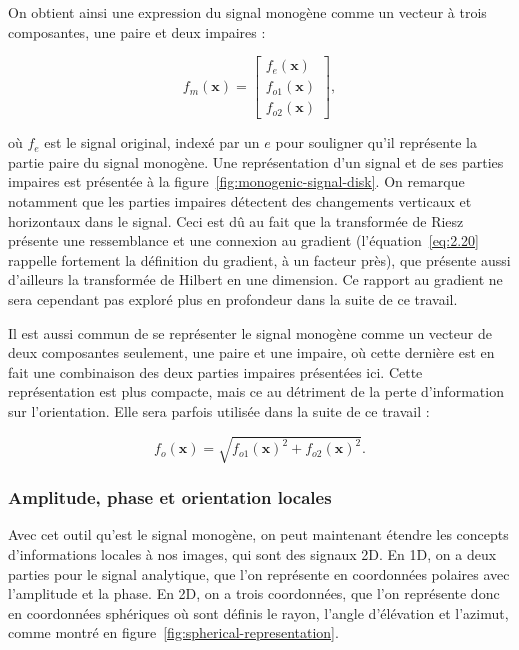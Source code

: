 On obtient ainsi une expression du signal monogène comme un vecteur à trois composantes, une paire et deux impaires :

\begin{equation}
    f_m(\mathbf{x}) =
    \left[
        \begin{array}{c}
        f_e(\mathbf{x}) \\
        f_{o1}(\mathbf{x}) \\
        f_{o2}(\mathbf{x})
        \end{array}
    \right],
\end{equation}

où $f_e$ est le signal original, indexé par un $e$ pour souligner qu'il représente la partie paire du signal monogène. Une représentation d'un signal et de ses parties impaires est présentée à la figure~\ref{fig:monogenic-signal-disk}. On remarque notamment que les parties impaires détectent des changements verticaux et horizontaux dans le signal. Ceci est dû au fait que la transformée de Riesz présente une ressemblance et une connexion au gradient (l'équation~\ref{eq:2.20} rappelle fortement la définition du gradient, à un facteur près), que présente aussi d'ailleurs la transformée de Hilbert en une dimension. Ce rapport au gradient ne sera cependant pas exploré plus en profondeur dans la suite de ce travail.

Il est aussi commun de se représenter le signal monogène comme un vecteur de deux composantes seulement, une paire et une impaire, où cette dernière est en fait une combinaison des deux parties impaires présentées ici. Cette représentation est plus compacte, mais ce au détriment de la perte d'information sur l'orientation. Elle sera parfois utilisée dans la suite de ce travail :

\begin{equation}
    f_o(\mathbf{x}) = \sqrt{f_{o1}(\mathbf{x})^2 + f_{o2}(\mathbf{x})^2}.
\end{equation}


\subsubsection{Amplitude, phase et orientation locales}

Avec cet outil qu'est le signal monogène, on peut maintenant étendre les concepts d'informations locales à nos images, qui sont des signaux 2D. En 1D, on a deux parties pour le signal analytique, que l'on représente en coordonnées polaires avec l'amplitude et la phase. En 2D, on a trois coordonnées, que l'on représente donc en coordonnées sphériques où sont définis le rayon, l'angle d'élévation et l'azimut, comme montré en figure~\ref{fig:spherical-representation}.

